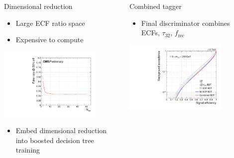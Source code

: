 \documentclass[aspectratio=169,xcolor=dvipsnames,,table,compress]{beamer}
\begin{document}
\begin{frame}[t]
\begin{columns}[T]
\begin{column}{0.33\textwidth}
  \end{column}
  \begin{column}{0.33\textwidth}
  \centering 
    Dimensional reduction \\  
  \begin{itemize}
    \item {\small Large ECF ratio space}
    \item {\small Expensive to compute }
  \end{itemize}
      \includegraphics[width=0.8\textwidth]{../figures/toptagging/bdt/fakerate_vs_eff50.pdf}
      \vspace{-5mm}
  \begin{itemize}
    \item {\small Embed dimensional reduction into boosted decision tree training}
  \end{itemize}
  \end{column}
  \begin{column}{0.33\textwidth}
    \centering 
    Combined tagger \\ 
    \begin{itemize}
      \item {\small Final discriminator combines ECFs, $\tau_{32}$, $f_\mathrm{rec}$ }
    \end{itemize}
      \includegraphics[width=0.8\textwidth]{../figures/toptagging/bdt/roc.pdf}

\end{column}
\end{columns}
\end{frame}
\end{document}

